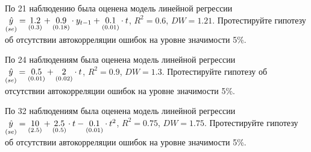 \begin{problem}
По 21 наблюдению была оценена модель линейной регрессии
$\underset{(se)}{\hat{y}}=\underset{(0.3)}{1.2}+\underset{(0.18)}{0.9}\cdot y_{t-1}+\underset{(0.01)}{0.1}\cdot t$, $R^2=0.6$, $DW=1.21$. Протестируйте гипотезу об отсутствии автокорреляции ошибок на уровне значимости 5\%.


\begin{sol}
\end{sol}
\end{problem}




\begin{problem}
По 24 наблюдениям была оценена модель линейной регрессии
$\underset{(se)}{\hat{y}}=\underset{(0.01)}{0.5}+\underset{(0.02)}{2}\cdot t$, $R^2=0.9$, $DW=1.3$. Протестируйте гипотезу об отсутствии автокорреляции ошибок на уровне значимости 5\%.


\begin{sol}
\end{sol}
\end{problem}



\begin{problem}
По 32 наблюдениям была оценена модель линейной регрессии
$\underset{(se)}{\hat{y}}=\underset{(2.5)}{10}+\underset{(0.5)}{2.5}\cdot t- \underset{(0.01)}{0.1}\cdot t^2$, $R^2=0.75$, $DW=1.75$. Протестируйте гипотезу об отсутствии автокорреляции ошибок на уровне значимости 5\%.


\begin{sol}
\end{sol}
\end{problem}



